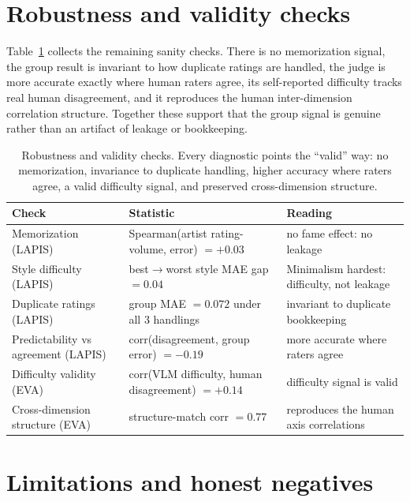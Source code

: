 \documentclass[10pt,twocolumn,letterpaper]{article}
\begin{document}
\section{Robustness and validity checks}
Table~\ref{tab:robust} collects the remaining sanity checks. There is no memorization signal, the group result is invariant to how duplicate ratings are handled, the judge is more accurate exactly where human raters agree, its self-reported difficulty tracks real human disagreement, and it reproduces the human inter-dimension correlation structure. Together these support that the group signal is genuine rather than an artifact of leakage or bookkeeping.

\begin{table}[h]
  \caption{Robustness and validity checks. Every diagnostic points the ``valid'' way: no memorization, invariance to duplicate handling, higher accuracy where raters agree, a valid difficulty signal, and preserved cross-dimension structure.}
  \label{tab:robust}
  \centering
  \small
  \setlength{\tabcolsep}{4pt}
  \begin{tabularx}{\linewidth}{@{}
      >{\raggedright\arraybackslash\hsize=0.85\hsize}X
      >{\raggedright\arraybackslash\hsize=1.30\hsize}X
      >{\raggedright\arraybackslash\hsize=0.85\hsize}X @{}}
    \toprule
    Check & Statistic & Reading \\
    \midrule
    Memorization (LAPIS) & Spearman(artist rating-volume, error) $=+0.03$ & no fame effect: no leakage \\
    Style difficulty (LAPIS) & best$\to$worst style MAE gap $=0.04$ & Minimalism hardest: difficulty, not leakage \\
    Duplicate ratings (LAPIS) & group MAE $=0.072$ under all 3 handlings & invariant to duplicate bookkeeping \\
    Predictability vs agreement (LAPIS) & corr(disagreement, group error) $=-0.19$ & more accurate where raters agree \\
    Difficulty validity (EVA) & corr(VLM difficulty, human disagreement) $=+0.14$ & difficulty signal is valid \\
    Cross-dimension structure (EVA) & structure-match corr $=0.77$ & reproduces the human axis correlations \\
    \bottomrule
  \end{tabularx}
\end{table}



\section{Limitations and honest negatives}
\label{sec:limits}
\end{document}

